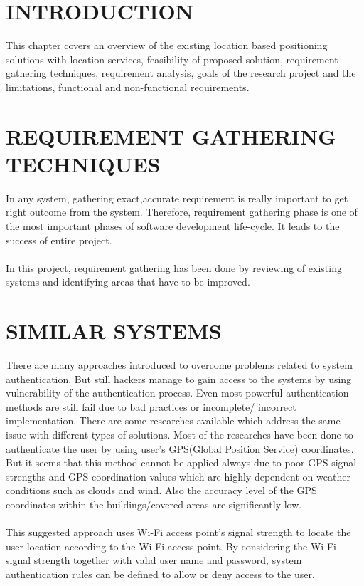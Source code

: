 \section{INTRODUCTION}
This chapter covers an overview of the existing location based positioning solutions  with location services, feasibility of proposed solution, requirement gathering techniques, requirement analysis, goals of the research project and the limitations, functional and non-functional requirements.

\section{REQUIREMENT GATHERING TECHNIQUES}
In any system, gathering exact,accurate requirement is really important to get right outcome from the system. Therefore, requirement gathering phase is one of the most important phases of software development life-cycle. It leads to the success of entire project.
	\paragraph{}
	In this project, requirement gathering has been done by reviewing of  existing systems and identifying areas that have to be improved.


\section{SIMILAR SYSTEMS}
There are many approaches introduced to overcome problems related to system authentication. But still hackers manage to gain access to the systems by using vulnerability of the authentication process. Even most powerful authentication methods are still fail due to bad practices or incomplete/ incorrect implementation. There are some researches available which address the same issue with different types of solutions. Most of the researches have been done to authenticate the user by using user's GPS(Global Position Service) coordinates. But it seems that this method cannot be applied always due to poor GPS signal strengths and GPS coordination values which are highly dependent on weather conditions such as clouds and wind. Also the accuracy level of the GPS coordinates within the buildings/covered areas are significantly low. 

\paragraph{}
This suggested approach uses Wi-Fi access point's signal strength to locate the user location according to the Wi-Fi access point. By considering the Wi-Fi signal strength together with valid user name and password, system authentication rules can be defined to allow or deny access to the user.

